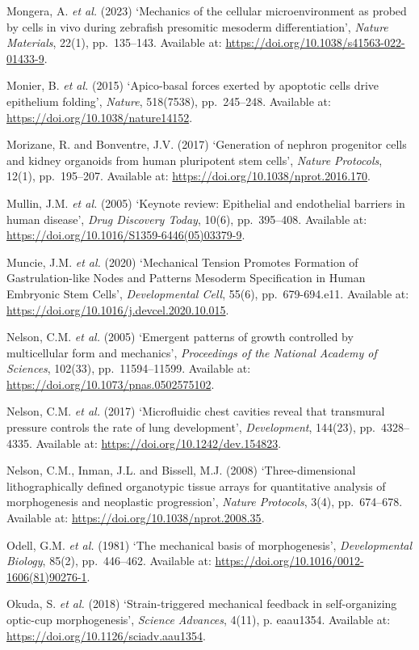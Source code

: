 \documentclass[
]{article}
\begin{document}
Mongera, A. \emph{et al.} (2023) `Mechanics of the cellular
microenvironment as probed by cells in vivo during zebrafish presomitic
mesoderm differentiation', \emph{Nature Materials}, 22(1), pp.~135--143.
Available at: \url{https://doi.org/10.1038/s41563-022-01433-9}.

Monier, B. \emph{et al.} (2015) `Apico-basal forces exerted by apoptotic
cells drive epithelium folding', \emph{Nature}, 518(7538), pp.~245--248.
Available at: \url{https://doi.org/10.1038/nature14152}.

Morizane, R. and Bonventre, J.V. (2017) `Generation of nephron
progenitor cells and kidney organoids from human pluripotent stem
cells', \emph{Nature Protocols}, 12(1), pp.~195--207. Available at:
\url{https://doi.org/10.1038/nprot.2016.170}.

Mullin, J.M. \emph{et al.} (2005) `Keynote review: Epithelial and
endothelial barriers in human disease', \emph{Drug Discovery Today},
10(6), pp.~395--408. Available at:
\url{https://doi.org/10.1016/S1359-6446(05)03379-9}.

Muncie, J.M. \emph{et al.} (2020) `Mechanical Tension Promotes Formation
of Gastrulation-like Nodes and Patterns Mesoderm Specification in Human
Embryonic Stem Cells', \emph{Developmental Cell}, 55(6),
pp.~679-694.e11. Available at:
\url{https://doi.org/10.1016/j.devcel.2020.10.015}.

Nelson, C.M. \emph{et al.} (2005) `Emergent patterns of growth
controlled by multicellular form and mechanics', \emph{Proceedings of
the National Academy of Sciences}, 102(33), pp.~11594--11599. Available
at: \url{https://doi.org/10.1073/pnas.0502575102}.

Nelson, C.M. \emph{et al.} (2017) `Microfluidic chest cavities reveal
that transmural pressure controls the rate of lung development',
\emph{Development}, 144(23), pp.~4328--4335. Available at:
\url{https://doi.org/10.1242/dev.154823}.

Nelson, C.M., Inman, J.L. and Bissell, M.J. (2008) `Three-dimensional
lithographically defined organotypic tissue arrays for quantitative
analysis of morphogenesis and neoplastic progression', \emph{Nature
Protocols}, 3(4), pp.~674--678. Available at:
\url{https://doi.org/10.1038/nprot.2008.35}.

Odell, G.M. \emph{et al.} (1981) `The mechanical basis of
morphogenesis', \emph{Developmental Biology}, 85(2), pp.~446--462.
Available at: \url{https://doi.org/10.1016/0012-1606(81)90276-1}.

Okuda, S. \emph{et al.} (2018) `Strain-triggered mechanical feedback in
self-organizing optic-cup morphogenesis', \emph{Science Advances},
4(11), p. eaau1354. Available at:
\url{https://doi.org/10.1126/sciadv.aau1354}.
\end{document}
